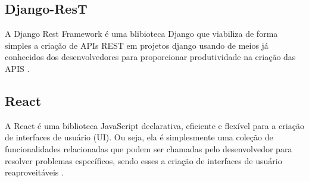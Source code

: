\subsection{Django-ResT}

A Django Rest Framework é uma blibioteca Django que viabiliza de forma simples a criação de APIs REST em projetos django usando de meios já conhecidos dos desenvolvedores para proporcionar produtividade na criação das APIS \cite{christie2011django}.

\subsection{React}

A React é uma biblioteca JavaScript declarativa, eficiente e flexível para a criação de interfaces de usuário (UI). Ou seja, ela é simplesmente uma coleção de funcionalidades relacionadas que podem ser chamadas pelo desenvolvedor para resolver problemas específicos, sendo esses a criação de interfaces de usuário reaproveitáveis \cite{reactjs}.